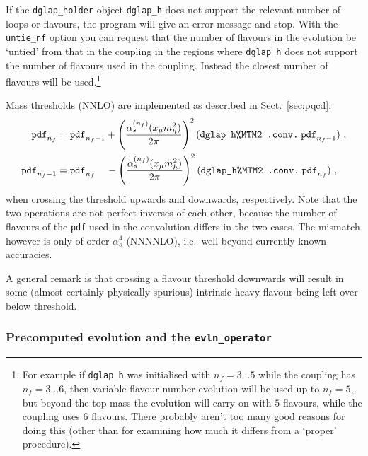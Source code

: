 \documentclass[12pt]{article}
\newcommand{\as}{\alpha_s}
\newcommand{\ie}{i.e.\ }
\newcommand{\ttt}[1]{\texttt{#1}}
\begin{document}
If the \ttt{dglap\_holder} object \ttt{dglap\_h} does not support the
relevant number of loops or flavours, the program will give an error
message and stop. With the \ttt{untie\_nf} option you can request that
the number of flavours in the evolution be `untied' from that in the
coupling in the regions where \ttt{dglap\_h} does not support the number of
flavours used in the coupling. Instead the closest number of flavours
will be used.\footnote{For example if \ttt{dglap\_h} was initialised with
  $n_f = 3\ldots5$ while the coupling has $n_f = 3\ldots 6$, then
  variable flavour number evolution will be used up to $n_f = 5$, but
  beyond the top mass the evolution will carry on with $5$ flavours,
  while the coupling uses $6$ flavours. There probably aren't too many
  good reasons for doing this (other than for examining how much it
  differs from a `proper' procedure).}

Mass thresholds (NNLO) are implemented as described in
Sect.~\ref{sec:pqcd}:
\begin{subequations}
\label{eq:mass_threshold}
\begin{align}
  \ttt{pdf}_{n_f} &= \ttt{pdf}_{n_f-1} +
  \left(\frac{\alpha_{s}^{(n_f)}(x_\mu m_h^2)}{2\pi}\right)^2
  (\mbox{\ttt{dglap\_h\%MTM2 .conv.}}\; \ttt{pdf}_{n_f-1}) \ ,\\
  \ttt{pdf}_{n_f-1} &= \ttt{pdf}_{n_f} \;\;\;\;-
  \left(\frac{\alpha_{s}^{(n_f)}(x_\mu m_h^2)}{2\pi}\right)^2
  (\mbox{\ttt{dglap\_h\%MTM2 .conv.}}\; \ttt{pdf}_{n_f}) \ ,
\end{align}
\end{subequations}
when crossing the threshold upwards and downwards, respectively. Note
that the two operations are not perfect inverses of each other,
because the number of flavours of the \ttt{pdf} used in the
convolution differs in the two cases. The mismatch however is only of
order $\as^4$ (NNNNLO), \ie well beyond currently known accuracies.

A general remark is that crossing a flavour threshold downwards will
result in some (almost certainly physically spurious)
intrinsic heavy-flavour being left over below threshold.

\subsubsection{Precomputed evolution and the \ttt{evln\_operator}}
\label{sec:precomputed-evolution}
\end{document}
